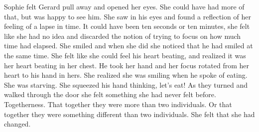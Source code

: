 

Sophie felt Gerard pull away and opened her eyes.  She could have had
more of that, but was happy to see him.  She saw in his eyes and found
a reflection of her feeling of a lapse in time.  It could have been
ten seconds or ten minutes, she felt like she had no idea and
discarded the notion of trying to focus on how much time had elapsed.
She smiled and when she did she noticed that he had smiled at the same
time.  She felt like she could feel his heart beating, and realized it
was her heart beating in her chest.  He took her hand and her focus
rotated from her heart to his hand in hers.  She realized she was
smiling when he spoke of eating.  She was starving.  She squeezed his
hand thinking, let's eat!  As they turned and walked through the door
she felt something she had never felt before.  Togetherness.  That
together they were more than two individuals.  Or that together they
were something different than two individuals.  She felt that she had
changed.

\bye
